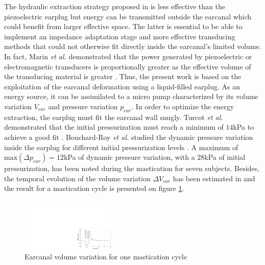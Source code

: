\documentclass[3p,twocolumn,preprint]{elsarticle}
\begin{document}
The hydraulic extraction strategy proposed in \cite{Delnavaz2012} is less effective than the piezoelectric earplug but energy can be transmitted outside the earcanal which could benefit from larger effective space. The latter is essential to be able to implement an impedance adaptation stage and more effective transducing methods that could not otherwise fit directly inside the earcanal's limited volume. In fact, Marin \emph{et al.} demonstrated that the power generated by piezoelectric or electromagnetic transducers is proportionally greater as the effective volume of the transducing material is greater \cite{Marin2011}. Thus, the present work is based on the exploitation of the earcanal deformation using a liquid-filled earplug. As an energy source, it can be assimilated to a micro pump characterized by its volume variation $V_{ear}$ and pressure variation $p_{ear}$. In order to optimize the energy extraction, the earplug must fit the earcanal wall snugly. Turcot \emph{et al.} demonstrated that the initial pressurization must reach a minimum of $14$kPa to achieve a good fit \cite{TURCOT2011}. Bouchard-Roy \emph{et al.} studied the dynamic pressure variation inside the earplug for different initial pressurization levels \cite{Bouchard-Roy2020}. A maximum of $\text{max}(\Delta p_{ear})=12$kPa of dynamic pressure variation, with a $28$kPa of initial pressurization, has been noted during the mastication for seven subjects. Besides, the temporal evolution of the volume variation $\Delta V_{ear}$ has been estimated in \cite{Delnavaz2012} and the result for a mastication cycle is presented on figure \ref{fig:deltaV_ear}.
\begin{figure}[!htbp]
	\centering
	\captionsetup{justification=centering}
	\includegraphics[trim={20.5cm 0cm 0cm 10.8cm},clip, width=0.4\textwidth]{figures/deltaV_ear.pdf}
	\caption{Earcanal volume variation for one mastication cycle}
	\label{fig:deltaV_ear}
\end{figure}
\end{document}
